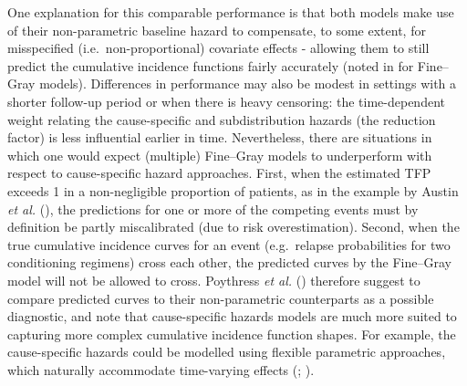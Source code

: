 \documentclass[
  letterpaper,
  paper=240mm:170mm,
  twoside=true,
  open=right,
  fontsize=10pt,
  pagesize=false,
  BCOR=15mm,
  DIV=14,
  headinclude=true,
  footinclude=false,
  headsepline=on]{scrbook}
\begin{document}
One explanation for this comparable performance is that both models make
use of their non-parametric baseline hazard to compensate, to some
extent, for misspecified (i.e.~non-proportional) covariate effects -
allowing them to still predict the cumulative incidence functions fairly
accurately (noted in
 for Fine--Gray models). Differences in performance may also be
modest in settings with a shorter follow-up period or when there is
heavy censoring: the time-dependent weight relating the cause-specific
and subdistribution hazards (the reduction factor) is less influential
earlier in time. Nevertheless, there are situations in which one would
expect (multiple) Fine--Gray models to underperform with respect to
cause-specific hazard approaches. First, when the estimated TFP exceeds
1 in a non-negligible proportion of patients, as in the example by
Austin \emph{et al.}
(), the
predictions for one or more of the competing events must by definition
be partly miscalibrated (due to risk overestimation). Second, when the
true cumulative incidence curves for an event (e.g.~relapse
probabilities for two conditioning regimens) cross each other, the
predicted curves by the Fine--Gray model will not be allowed to cross.
Poythress \emph{et al.}
() therefore
suggest to compare predicted curves to their non-parametric counterparts
as a possible diagnostic, and note that cause-specific hazards models
are much more suited to capturing more complex cumulative incidence
function shapes. For example, the cause-specific hazards could be
modelled using flexible parametric approaches, which naturally
accommodate time-varying effects
(;
).
\end{document}
